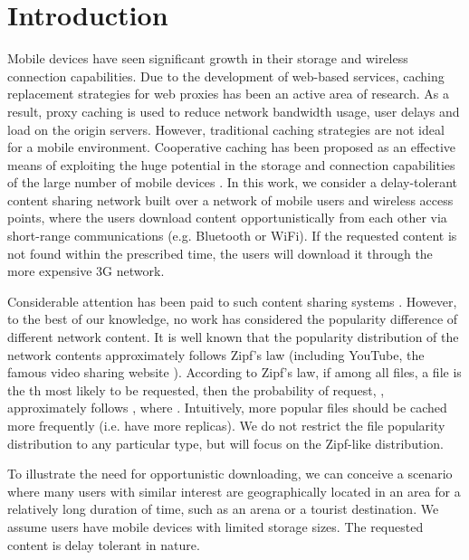 \documentclass{sig-alternate}
\begin{document}

\section{Introduction}
Mobile devices have seen significant growth in their storage and wireless connection capabilities. Due to the development of web-based services, caching replacement strategies for web proxies has been an active area of research. As a result, proxy caching is used to reduce network bandwidth usage, user delays and load on the origin servers. However, traditional caching strategies are not ideal for a mobile environment. Cooperative caching has been proposed as an effective means of exploiting the huge potential in the storage and connection capabilities of the large number of mobile devices \cite{zhuo2011social} \cite{zhuocontact} \cite{ioannidis2010distributed}. In this work, we consider a delay-tolerant content sharing network built over a network of mobile users and wireless access points, where the users download content opportunistically from each other via short-range communications (e.g. Bluetooth or WiFi). If the requested content is not found within the prescribed time, the users will download it through the more expensive 3G network. 

\vspace{1mm}

Considerable attention has been paid to such content sharing systems \cite{ioannidis2010distributed}\cite{zhuo2011social} \cite{zhuocontact}. However, to the best of our knowledge, no work has considered the popularity difference of different network content. It is well known that the popularity distribution of the network contents approximately follows Zipf's law (including YouTube, the famous video sharing website \cite{breslau1999web} \cite{cha2007tube}). According to Zipf's law, if among all files, a file is the th most likely to be requested,  then the probability of request, , approximately follows , where . Intuitively, more popular files should be cached more frequently (i.e. have more replicas). We do not restrict the file popularity distribution to any particular type, but will focus on the Zipf-like distribution. 

\vspace{1mm}

To illustrate the need for opportunistic downloading, we can conceive a scenario where many users with similar interest are geographically located in an area for a relatively long duration of time, such as an arena or a tourist destination. We assume users have mobile devices with limited storage sizes. The requested content is delay tolerant in nature. 
\end{document}
